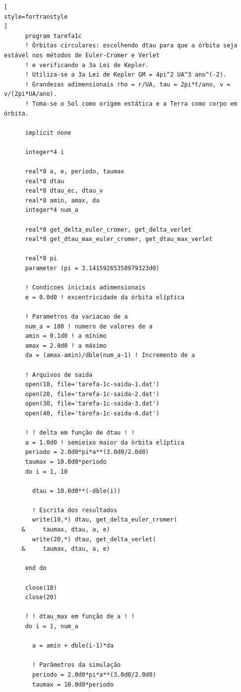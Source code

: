 \documentclass[12pt,a4paper]{article}
\begin{document}
\begin{lstlisting}[
style=fortranstyle
]
      program tarefa1c
      ! Órbitas circulares: escolhendo dtau para que a órbita seja estável nos métodos de Euler-Cromer e Verlet
      ! e verificando a 3a Lei de Kepler.
      ! Utiliza-se a 3a Lei de Kepler GM = 4pi^2 UA^3 ano^(-2).
      ! Grandezas adimensionais rho = r/UA, tau = 2pi*t/ano, v = v/(2pi*UA/ano).
      ! Toma-se o Sol como origem estática e a Terra como corpo em órbita.

      implicit none

      integer*4 i

      real*8 a, e, periodo, taumax
      real*8 dtau
      real*8 dtau_ec, dtau_v
      real*8 amin, amax, da
      integer*4 num_a

      real*8 get_delta_euler_cromer, get_delta_verlet
      real*8 get_dtau_max_euler_cromer, get_dtau_max_verlet

      real*8 pi
      parameter (pi = 3.14159265358979323d0)

      ! Condicoes iniciais adimensionais
      e = 0.0d0 ! excentricidade da órbita elíptica

      ! Parametros da variacao de a
      num_a = 100 ! numero de valores de a
      amin = 0.1d0 ! a mínimo
      amax = 2.0d0 ! a máximo
      da = (amax-amin)/dble(num_a-1) ! Incremento de a

      ! Arquivos de saida
      open(10, file='tarefa-1c-saida-1.dat')
      open(20, file='tarefa-1c-saida-2.dat')
      open(30, file='tarefa-1c-saida-3.dat')
      open(40, file='tarefa-1c-saida-4.dat')

      ! ! delta em função de dtau ! !
      a = 1.0d0 ! semieixo maior da órbita elíptica
      periodo = 2.0d0*pi*a**(3.0d0/2.0d0)
      taumax = 10.0d0*periodo
      do i = 1, 10

        dtau = 10.0d0**(-dble(i))

        ! Escrita dos resultados
        write(10,*) dtau, get_delta_euler_cromer(
     &     taumax, dtau, a, e)
        write(20,*) dtau, get_delta_verlet(
     &     taumax, dtau, a, e)

      end do

      close(10)
      close(20)

      ! ! dtau_max em função de a ! !
      do i = 1, num_a

        a = amin + dble(i-1)*da

        ! Parâmetros da simulação
        periodo = 2.0d0*pi*a**(3.0d0/2.0d0)
        taumax = 10.0d0*periodo


\end{lstlisting}
\end{document}
